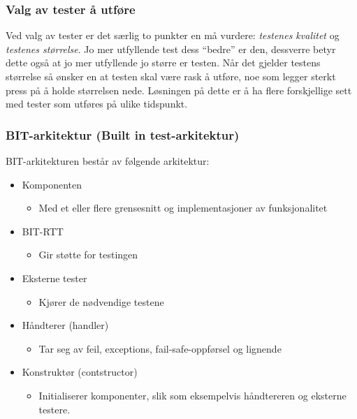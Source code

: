 \subsubsection{Valg av tester å utføre}

Ved valg av tester er det særlig to punkter en må vurdere:
\emph{testenes kvalitet} og \emph{testenes størrelse}. Jo mer utfyllende
test dess ``bedre'' er den, dessverre betyr dette også at jo mer
utfyllende jo større er testen. Når det gjelder testens størrelse så
ønsker en at testen skal være rask å utføre, noe som legger sterkt press
på å holde størrelsen nede. Løsningen på dette er å ha flere
forskjellige sett med tester som utføres på ulike tidspunkt.

\subsubsection{BIT-arkitektur (Built in test-arkitektur)}

BIT-arkitekturen består av følgende arkitektur:

\begin{itemize}
\item
  Komponenten
  \begin{itemize}
  \item
    Med et eller flere grensesnitt og implementasjoner av funksjonalitet
  \end{itemize}
\item
  BIT-RTT
  \begin{itemize}
  \item
    Gir støtte for testingen
  \end{itemize}
\item
  Eksterne tester
  \begin{itemize}
  \item
    Kjører de nødvendige testene
  \end{itemize}
\item
  Håndterer (handler)
  \begin{itemize}
  \item
    Tar seg av feil, exceptions, fail-safe-oppførsel og lignende
  \end{itemize}
\item
  Konstruktør (contstructor)
  \begin{itemize}
  \item
    Initialiserer komponenter, slik som eksempelvis håndtereren og
    eksterne testere.
  \end{itemize}
\end{itemize}
